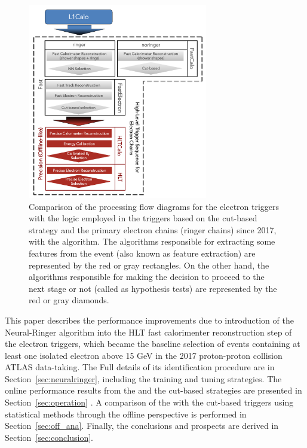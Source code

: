 \begin{figure}[h!tb]
  \centering
  \includegraphics[width=0.7\textwidth]{sections/01_introduction/figures/ElectronChain_Run2_noringer_and_ringer.pdf}
  \caption{Comparison of the processing flow diagrams for the electron triggers with the logic employed in the triggers based on the cut-based strategy and the primary electron
  chains (ringer chains) since 2017, with the \rnn{} algorithm. The algorithms responsible for extracting some features from the event (also known as feature extraction) are represented by the red or gray rectangles. On the other hand, the algorithms responsible for making the decision to proceed to the next stage or not (called as hypothesis tests) are represented by the red or gray diamonds.}
  \label{fig:electron_chain}
\end{figure}




This paper describes the performance improvements due to introduction of the Neural-Ringer algorithm into the HLT fast calorimenter reconstruction step of the electron triggers, which became the baseline selection of events containing at least one isolated electron above 15 GeV in the 2017 proton-proton collision ATLAS data-taking. The Full details of its identification procedure are in Section~\ref{sec:neuralringer}, including the training and tuning strategies. The online performance results from the \rnn and the cut-based strategies are presented in Section~\ref{sec:operation} . A comparison of the \rnn with the cut-based triggers using statistical methods through the offline perspective is performed in Section~\ref{sec:off_ana}. Finally, the conclusions and prospects 
are derived in Section~\ref{sec:conclusion}.
